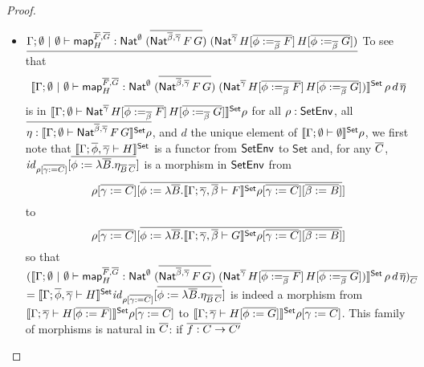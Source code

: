\documentclass[acmsmall,review,anonymous]{acmart}
\theoremstyle{definition}
\newcommand{\set}{\mathsf{Set}}
\renewcommand{\id}{\mathit{id}}
\newcommand{\map}{\mathsf{map}}
\begin{document}
\begin{proof}
\begin{itemize}

\item 
  $\underline{\Gamma;\emptyset~|~\emptyset \vdash
  \map^{\ol{F},\ol{G}}_H :
  \Nat^\emptyset\;(\ol{\Nat^{\ol{\beta},\ol{\gamma}}\,F\,G})\;
  (\Nat^{\ol{\gamma}}\,H[\ol{\phi :=_{\ol{\beta}} F}]\,H[\ol{\phi
      :=_{\ol{\beta}} G}])}$\;
To see that
\[
\setsem{\Gamma; \emptyset~|~\emptyset \vdash \map^{\ol{F},\ol{G}}_H
    : \Nat^\emptyset\;(\ol{\Nat^{\ol{\beta},\ol{\gamma}}\,F\,G})\;
    (\Nat^{\ol{\gamma}}\,H[\ol{\phi :=_{\ol{\beta}} F}]\,H[\ol{\phi
        :=_{\ol{\beta}} G}])}\,\rho\,d\, \ol{\eta}
\]
is in $\setsem{\Gamma; \emptyset \vdash
    \Nat^{\ol{\gamma}}\,H[\ol{\phi :=_{\ol{\beta}} F}]\,H[\ol{\phi
        :=_{\ol{\beta}} G}]} \rho$
for all $\rho : \mathsf{SetEnv}$, all $\ol{\eta : \setsem{\Gamma; \emptyset
  \vdash\Nat^{\ol{\beta},\ol{\gamma}}\,F\,G} \rho}$,
  and $d$ the unique element of $\setsem{\Gamma;\emptyset \vdash \emptyset} \rho$,
  we first note that
$\setsem{\Gamma ;\ol{\phi}, \ol{\gamma} \vdash H}$ is a functor from
  $\mathsf{SetEnv}$ to $\set$ and, for any $\overline{C}$, $\id_{\rho[\ol{\gamma :=
        C}]}[\ol{\phi := \lambda \ol{B}. \eta_{\ol{B}\,\ol{C}}}]$ is a
  morphism in $\mathsf{SetEnv}$ from \[\rho[\ol{\gamma := C}][\ol{\phi :=
      \lambda \ol{B}.\setsem{\Gamma; \ol{\gamma},\ol{\beta} \vdash
        F}\rho[\ol{\gamma := C}][\ol{\beta := B}]}]\] to
\[\rho[\ol{\gamma := C}][\ol{\phi := \lambda \ol{B}.\setsem{\Gamma;
\ol{\gamma},\ol{\beta} \vdash G}\rho[\ol{\gamma := C}][\ol{\beta := B}]}]\]
so that
$(\setsem{\Gamma; \emptyset~|~\emptyset \vdash
\map^{\ol{F},\ol{G}}_H :
\Nat^\emptyset\;(\ol{\Nat^{\ol{\beta},\ol{\gamma}}\,F\,G})\;
(\Nat^{\ol{\gamma}}\,H[\ol{\phi :=_{\ol{\beta}} F}]\,H[\ol{\phi
    :=_{\ol{\beta}} G}])}\,\rho\,d\, \ol{\eta})_{\ol{C}}$
$=  \setsem{\Gamma; \ol{\phi},\ol{\gamma} \vdash H}\id_{\rho[\ol{\gamma
      := C}]}[\ol{\phi := \lambda \ol{B}. \eta_{\ol{B}\,\ol{C}}}]$
is indeed a morphism from
$\setsem{\Gamma ;\ol{\gamma} \vdash H[\ol{\phi := F}]}\rho[\ol{\gamma
      := C}]$
to 
$ \setsem{\Gamma ;\ol{\gamma} \vdash H[\ol{\phi := G}]}\rho[\ol{\gamma
      := C}]$.
This family of morphisms is natural in $\overline{C}$: if $\overline{f : C \to C'}$

\end{itemize}
\end{proof}
\end{document}
